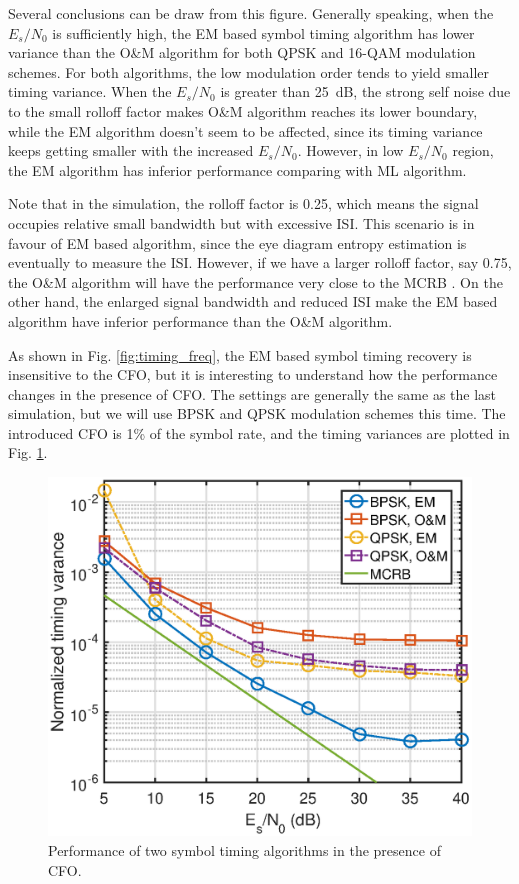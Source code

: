 \documentclass[journal,comsoc]{IEEEtran}
\begin{document}
Several conclusions can be draw from this figure.
Generally speaking, when the  \(E_s/N_0\) is sufficiently high, the EM based symbol timing algorithm has lower variance than the O\&M algorithm for both QPSK and 16-QAM modulation schemes.
For both algorithms, the low modulation order tends to yield smaller timing variance.
When the \(E_s/N_0\) is greater than 25~dB, the strong self noise due to the small rolloff factor makes O\&M algorithm reaches its lower boundary, while the EM algorithm doesn't seem to be affected, since  its timing variance keeps getting smaller with the increased \(E_s/N_0\).
However, in low \(E_s/N_0\) region, the EM algorithm has inferior performance comparing with ML algorithm.


Note that in the simulation, the rolloff factor is 0.25, which means the signal occupies relative small bandwidth but with excessive ISI.
This scenario is in favour of EM based algorithm, since the eye diagram entropy estimation is eventually to measure the ISI.
However, if we have a larger rolloff factor, say 0.75, the O\&M algorithm will have the performance very close to the MCRB \cite{mengali1997synchronization}.
On the other hand, the enlarged signal bandwidth and reduced ISI make the EM based algorithm have inferior performance than the O\&M algorithm.

As shown in Fig. \ref{fig:timing_freq}, the EM based symbol timing recovery is insensitive to the CFO, but it is interesting to understand how the performance changes in the presence of CFO. 
The settings are generally the same as the last simulation, but we will use BPSK and QPSK modulation schemes this time.
The introduced CFO is 1\% of the symbol rate, and the timing variances are plotted in Fig. \ref{fig:timing_frq_per}.

\begin{figure}[ht]
\centering
\includegraphics[width=3 in]{pic/per_timing_frq.eps}
\caption{Performance of two symbol timing algorithms in the presence of CFO.}
\label{fig:timing_frq_per} 
\end{figure}  
\end{document}
